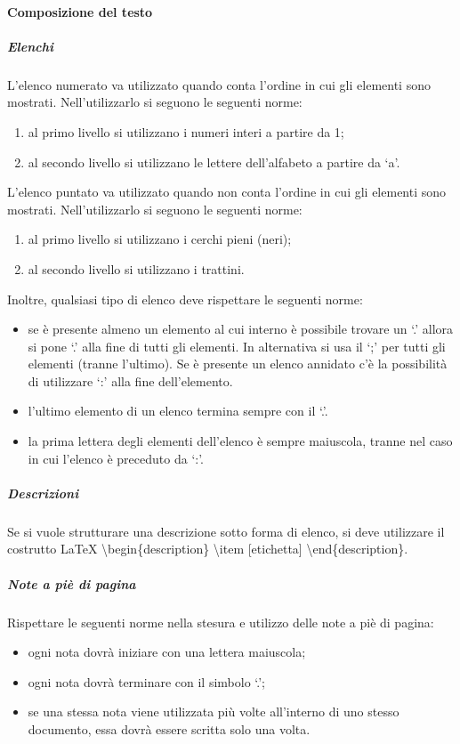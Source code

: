 			\paragraph{Composizione del testo}
				\subparagraph{Elenchi}
					L’elenco numerato va utilizzato quando conta l’ordine in cui gli elementi sono mostrati. Nell’utilizzarlo si seguono le seguenti norme:
					\begin{enumerate}
						\item al primo livello si utilizzano i numeri interi a partire da 1;
						\item al secondo livello si utilizzano le lettere dell’alfabeto a partire da ‘a’.
					\end{enumerate}
					L’elenco puntato va utilizzato quando non conta l’ordine in cui gli elementi sono mostrati. Nell’utilizzarlo si seguono le seguenti norme:
					\begin{enumerate}
						\item al primo livello si utilizzano i cerchi pieni (neri);
						\item al secondo livello si utilizzano i trattini.
					\end{enumerate}
					Inoltre, qualsiasi tipo di elenco deve rispettare le seguenti norme:
					\begin{itemize}
						\item se è presente almeno un elemento al cui interno è possibile trovare un ‘.’ allora si pone ‘.’ alla fine di tutti gli elementi. In alternativa si usa il ‘;’ per tutti gli elementi (tranne l’ultimo). Se è presente un elenco annidato c’è la possibilità di utilizzare ‘:’ alla fine dell’elemento.
						\item l’ultimo elemento di un elenco termina sempre con il ‘.’.
						\item la prima lettera degli elementi dell’elenco è sempre maiuscola, tranne nel caso in cui l’elenco è preceduto da ‘:’.
					\end{itemize}
				\subparagraph{Descrizioni}
					Se si vuole strutturare una descrizione sotto forma di elenco, si deve utilizzare il costrutto \LaTeX{} \textbackslash begin\{description\} \textbackslash item [etichetta] \textbackslash end\{description\}.
				\subparagraph{Note a piè di pagina}
					Rispettare le seguenti norme nella stesura e utilizzo delle note a piè di pagina:
					\begin{itemize}
						\item ogni nota dovrà iniziare con una lettera maiuscola;
						\item ogni nota dovrà terminare con il simbolo ‘.’;
						\item se una stessa nota viene utilizzata più volte all’interno di uno stesso documento, essa dovrà essere scritta solo una volta.
					\end{itemize}
